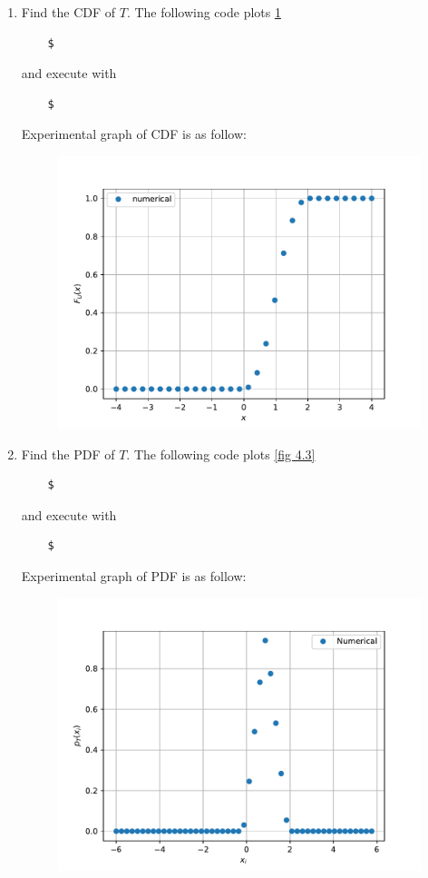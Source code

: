 \documentclass[journal,12pt,twocolumn]{IEEEtran}
\renewcommand\thesection{\arabic{section}}
\begin{document}
\begin{enumerate}[label=\thesection.\arabic*.,ref=\thesection.\theenumi]
    \item Find the CDF of $T$.
    \solution 
    The following code plots \ref{fig 4.2}
    \begin{lstlisting}
    $    
    \end{lstlisting}
    and execute with
    \begin{lstlisting}
    $
    \end{lstlisting}
    Experimental graph of CDF is as follow:
    \begin{figure}[H]
        \includegraphics[scale=0.6]{./figs/4.2}
        \label{fig 4.2}
    \end{figure}
    \item Find the PDF of $T$.
    \solution 
    The following code plots \ref{fig 4.3}
    \begin{lstlisting}
    $    
    \end{lstlisting}
    and execute with
    \begin{lstlisting}
    $
    \end{lstlisting}
    Experimental graph of PDF is as follow:
    \begin{figure}[H]
        \includegraphics[scale=0.6]{./figs/4.3}

\end{figure}
\end{enumerate}
\end{document}
